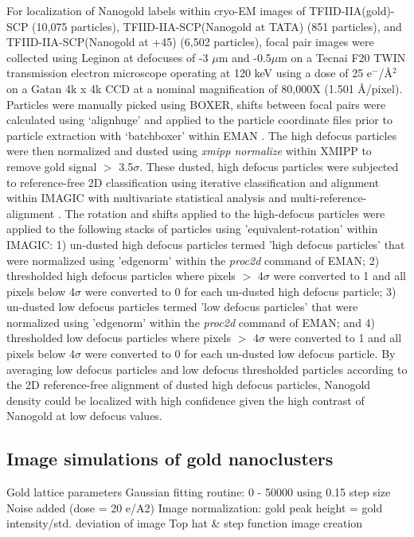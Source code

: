 For localization of Nanogold labels within cryo-EM images of TFIID-IIA(gold)-SCP (10,075 particles), TFIID-IIA-SCP(Nanogold at TATA) (851 particles), and TFIID-IIA-SCP(Nanogold at +45) (6,502 particles), focal pair images were collected using Leginon \cite{Suloway_1311} at defocuses of -3 $\mu$m and -0.5$\mu$m on a Tecnai F20 TWIN transmission electron microscope operating at 120 keV using a dose of 25 e$^{-}$/\AA$^{2}$ on a Gatan 4k x 4k CCD at a nominal magnification of 80,000X (1.501 \AA/pixel).  Particles were manually picked using BOXER, shifts between focal pairs were calculated using ‘alignhuge’ and applied to the particle coordinate files prior to particle extraction with ‘batchboxer’ within EMAN \cite{Ludtke_2307}.  The high defocus particles were then normalized and dusted using \emph{xmipp normalize} within XMIPP \cite{Sorzano_1492} to remove gold signal $>$ 3.5$\sigma$. These dusted, high defocus particles were subjected to reference-free 2D classification using iterative classification and alignment within IMAGIC with multivariate statistical analysis and multi-reference-alignment \cite{va_2849}. The rotation and shifts applied to the high-defocus particles were applied to the following stacks of particles using 'equivalent-rotation' within IMAGIC:  1) un-dusted high defocus particles termed 'high defocus particles' that were normalized using 'edgenorm' within the \emph{proc2d} command of EMAN; 2) thresholded high defocus particles where pixels $>$ 4$\sigma$ were converted to 1 and all pixels below 4$\sigma$ were converted to 0 for each un-dusted high defocus particle; 3) un-dusted low defocus particles termed 'low defocus particles' that were normalized using 'edgenorm' within the \emph{proc2d} command of EMAN; and 4) thresholded low defocus particles where pixels $>$ 4$\sigma$ were converted to 1 and all pixels below 4$\sigma$ were converted to 0 for each un-dusted low defocus particle.  By averaging low defocus particles and low defocus thresholded particles according to the 2D reference-free alignment of dusted high defocus particles, Nanogold density could be localized with high confidence given the high contrast of Nanogold at low defocus values.

\subsection{Image simulations of gold nanoclusters}

Gold lattice parameters
Gaussian fitting routine: 0 - 50000 using 0.15 step size
Noise added (dose = 20 e/A2)
Image normalization: gold peak height = gold intensity/std. deviation of image
Top hat \& step function image creation

